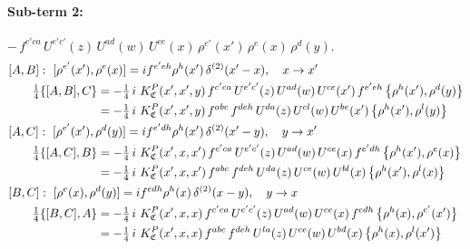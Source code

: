 \documentclass[10pt]{article}
\numberwithin{equation}{section}
\begin{document}
\paragraph{Sub-term 2:} $-\,f^{c'ca}\,U^{e'c'}(z)\,U^{ad}(w)\,U^{ce}(x)\,\rho^{e'}(x')\,\rho^{e}(x)\,\rho^{d}(y)$.
\begin{align}
&[A,B]:\ [\rho^{e'}(x'),\rho^{e}(x)]=i f^{e'eh}\rho^{h}(x')\,\delta^{(2)}(x'-x),\quad x\to x'\notag\\
&\qquad \tfrac14\{[A,B],C\}=-\tfrac14\,i\,\,K^{P}_{\mathfrak C}(x',x',y)\,f^{c'ca}\,U^{e'c'}(z)\,U^{ad}(w)\,U^{ce}(x')\,f^{e'eh}\,\big\{\rho^{h}(x'),\rho^{d}(y)\big\}\notag\\
&\qquad\phantom{\tfrac14\{[A,B],C\}}=-\tfrac14\,i\,\,K^{P}_{\mathfrak C}(x',x',y)\,f^{abc}\,f^{deh}\,U^{da}(z)\,U^{cl}(w)\,U^{be}(x')\,\big\{\rho^{h}(x'),\rho^{l}(y)\big\}
\label{B:eq:GIII.V.P-2-AB}\\
&[A,C]:\ [\rho^{e'}(x'),\rho^{d}(y)]=i f^{e'dh}\rho^{h}(x')\,\delta^{(2)}(x'-y),\quad y\to x'\notag\\
&\qquad \tfrac14\{[A,C],B\}=-\tfrac14\,i\,\,K^{P}_{\mathfrak C}(x',x,x')\,f^{c'ca}\,U^{e'c'}(z)\,U^{ad}(w)\,U^{ce}(x)\,f^{e'dh}\,\big\{\rho^{h}(x'),\rho^{e}(x)\big\}\notag\\
&\qquad\phantom{\tfrac14\{[A,C],B\}}=-\tfrac14\,i\,\,K^{P}_{\mathfrak C}(x',x,x')\,f^{abc}\,f^{deh}\,U^{da}(z)\,U^{ce}(w)\,U^{bl}(x)\,\big\{\rho^{h}(x'),\rho^{l}(x)\big\}
\label{B:eq:GIII.V.P-2-AC}\\
&[B,C]:\ [\rho^{e}(x),\rho^{d}(y)]=i f^{edh}\rho^{h}(x)\,\delta^{(2)}(x-y),\quad y\to x\notag\\
&\qquad \tfrac14\{[B,C],A\}=-\tfrac14\,i\,\,K^{P}_{\mathfrak C}(x',x,x)\,f^{c'ca}\,U^{e'c'}(z)\,U^{ad}(w)\,U^{ce}(x)\,f^{edh}\,\big\{\rho^{h}(x),\rho^{e'}(x')\big\}\notag\\
&\qquad\phantom{\tfrac14\{[B,C],A\}}=-\tfrac14\,i\,\,K^{P}_{\mathfrak C}(x',x,x)\,f^{abc}\,f^{deh}\,U^{la}(z)\,U^{ce}(w)\,U^{bd}(x)\,\big\{\rho^{h}(x),\rho^{l}(x')\big\}
\label{B:eq:GIII.V.P-2-BC}
\end{align}
\end{document}
